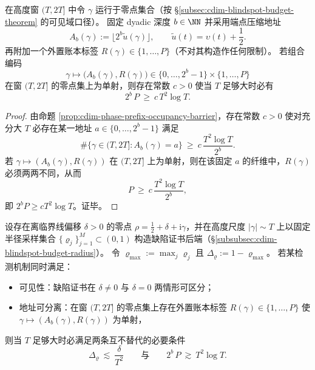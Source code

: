 \begin{theorem}\label{thm:cdim-address-ledger-joint-budget-lower-bound}
在高度窗 \((T,2T]\) 中令 \(\gamma\) 运行于零点集合（按 \S\ref{subsec:cdim-blindspot-budget-theorem} 的可见域口径）。
固定 dyadic 深度 \(b\in\NN\) 并采用端点压缩地址
\[
A_b(\gamma):=\bigl\lfloor 2^b\widetilde u(\gamma)\bigr\rfloor,
\qquad
\widetilde u(t)=\upsilon(t)+\frac12.
\]
再附加一个外置账本标签 \(R(\gamma)\in\{1,\dots,P\}\)（不对其构造作任何限制）。
若组合编码
\[
\gamma \longmapsto \bigl(A_b(\gamma),R(\gamma)\bigr)\in \{0,\dots,2^b-1\}\times \{1,\dots,P\}
\]
在窗 \((T,2T]\) 的零点集上为单射，则存在常数 \(c>0\) 使当 \(T\) 足够大时必有
\[
2^b\,P\ \ge\ c\,T^2\log T.
\]
\end{theorem}

\begin{proof}
由命题 \ref{prop:cdim-phase-prefix-occupancy-barrier}，存在常数 \(c>0\) 使对充分大 \(T\) 必存在某一地址 \(a\in\{0,\dots,2^b-1\}\) 满足
\[
\#\{\gamma\in(T,2T]:A_b(\gamma)=a\}\ \ge\ c\,\frac{T^2\log T}{2^b}.
\]
若 \(\gamma\mapsto(A_b(\gamma),R(\gamma))\) 在 \((T,2T]\) 上为单射，则在该固定 \(a\) 的纤维中，\(R(\gamma)\) 必须两两不同，从而
\[
P\ \ge\ c\,\frac{T^2\log T}{2^b},
\]
即 \(2^bP\ge cT^2\log T\)。证毕。
\end{proof}

\begin{corollary}[半径盲区预算与联合离散预算的正交必要条件]\label{cor:cdim-radius-blindspot-and-joint-discrete-budget-orthogonal}
设存在离临界线偏移 \(\delta>0\) 的零点 \(\rho=\tfrac12+\delta+\mathrm{i}\gamma\)，并在高度尺度 \(|\gamma|\sim T\) 上以固定半径采样集合 \(\{\varrho_j\}_{j=1}^{M}\subset(0,1)\) 构造缺陷证书后端（\S\ref{subsubsec:cdim-blindspot-budget-radius}）。
令 \(\varrho_{\max}:=\max_j\varrho_j\) 且 \(\Delta_{\varrho}:=1-\varrho_{\max}\)。
若某检测机制同时满足：
\begin{itemize}
  \item 可见性：缺陷证书在 \(\delta\neq 0\) 与 \(\delta=0\) 两情形可区分；
  \item 地址可分离：在窗 \((T,2T]\) 的零点集上存在外置账本标签 \(R(\gamma)\in\{1,\dots,P\}\) 使 \(\gamma\mapsto(A_b(\gamma),R(\gamma))\) 为单射，
\end{itemize}
则当 \(T\) 足够大时必满足两条互不替代的必要条件
\[
\Delta_{\varrho}\ \lesssim\ \frac{\delta}{T^2}
\qquad\text{与}\qquad
2^b\,P\ \gtrsim\ T^2\log T.
\]
\end{corollary}

